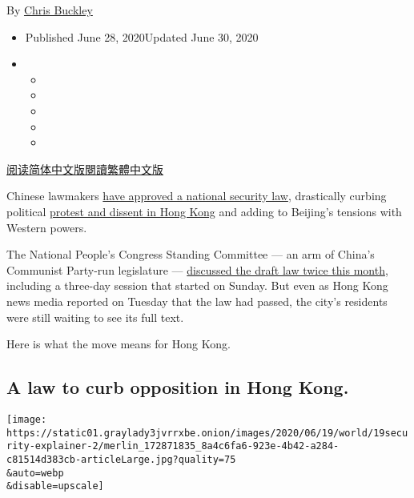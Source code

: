 By \href{https://www.nytimes3xbfgragh.onion/by/chris-buckley}{Chris
Buckley}

\begin{itemize}
\item
  Published June 28, 2020Updated June 30, 2020
\item
  \begin{itemize}
  \item
  \item
  \item
  \item
  \item
  \end{itemize}
\end{itemize}

\href{https://cn.nytimes3xbfgragh.onion/china/20200629/china-hong-kong-national-security-law/}{阅读简体中文版}\href{https://cn.nytimes3xbfgragh.onion/china/20200629/china-hong-kong-national-security-law/zh-hant/}{閱讀繁體中文版}

Chinese lawmakers
\href{https://www.nytimes3xbfgragh.onion/2020/06/29/world/asia/china-hong-kong-security-law-rules.html}{have
approved a national security law}, drastically curbing political
\href{https://www.nytimes3xbfgragh.onion/2020/06/28/world/asia/china-hong-kong-national-security-law.html}{protest
and dissent in Hong Kong} and adding to Beijing's tensions with Western
powers.

The National People's Congress Standing Committee --- an arm of China's
Communist Party-run legislature ---
\href{https://www.nytimes3xbfgragh.onion/2020/06/20/world/asia/china-hong-kong-security-law.html}{discussed
the draft law twice this month}, including a three-day session that
started on Sunday. But even as Hong Kong news media reported on Tuesday
that the law had passed, the city's residents were still waiting to see
its full text.

Here is what the move means for Hong Kong.

\hypertarget{a-law-to-curb-opposition-in-hong-kong}{%
\subsection{A law to curb opposition in Hong
Kong.}\label{a-law-to-curb-opposition-in-hong-kong}}

\texttt{[image: https://static01.graylady3jvrrxbe.onion/images/2020/06/19/world/19security-explainer-2/merlin\_172871835\_8a4c6fa6-923e-4b42-a284-c81514d383cb-articleLarge.jpg?quality=75\\\&auto=webp\\\&disable=upscale]}

